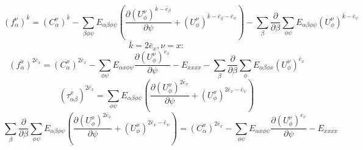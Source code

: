 \documentclass[a4paper,12pt]{article}
\begin{document}
\begin{landscape}
$$
\left(f^{\nu}_{\alpha}\right)^{\bar{k}}=
\left(C^{\nu}_{\alpha}\right)^{\bar{k}}-
\sum\limits_{\beta\phi\psi} E_{\alpha\beta\phi\psi} 
\left(\frac{\partial\left(U^{\nu}_{\phi}\right)^{\bar{k}-\bar{e}_{\beta}}}{\partial \psi} + \left(U^{\nu}_{\phi}\right)^{\bar{k}-\bar{e}_{\beta}-\bar{e}_{\psi}}\right)
-\sum\limits_{\beta}\frac{\partial}{\partial\beta}\sum\limits_{\phi\psi}
E_{\alpha\beta\phi\psi}\left(U^{\nu}_{\phi}\right)^{\bar{k}-\bar{e}_{\psi}}
$$
$$
\bar{k}=2\bar{e}_x, \nu = x:
$$
$$
\left(f^{x}_{\alpha}\right)^{2\bar{e}_x}=
\left(C^{x}_{\alpha}\right)^{2\bar{e}_x}-
\sum\limits_{\phi\psi} E_{\alpha x \phi\psi}
\frac{\partial\left(U^{\nu}_{\phi}\right)^{e_x}}{\partial \psi}-
E_{x x x x}
-\sum\limits_{\beta}\frac{\partial}{\partial\beta}\sum\limits_{\phi}
E_{\alpha\beta\phi x}\left(U^{\nu}_{\phi}\right)^{\bar{e}_x}
$$
$$
\left(\tau^{x}_{\alpha\beta}\right)^{2\bar{e}_x}=
\sum\limits_{\phi\psi} E_{\alpha\beta\phi\psi}
\left(\frac{\partial\left(U^{x}_{\phi}\right)^{2\bar{e}_x}}{\partial \psi} + \left(U^{x}_{\phi}\right)^{2\bar{e}_x-\bar{e}_{\psi}}\right)
$$
$$
\sum\limits_{\beta}\frac{\partial}{\partial\beta}\sum\limits_{\phi\psi}
E_{\alpha\beta\phi\psi}
\left(\frac{\partial\left(U^{x}_{\phi}\right)^{2\bar{e}_x}}{\partial \psi} + \left(U^{x}_{\phi}\right)^{2\bar{e}_x-\bar{e}_{\psi}}\right)
=
\left(C^{x}_{\alpha}\right)^{2\bar{e}_x}-
\sum\limits_{\phi\psi} E_{\alpha x \phi\psi}
\frac{\partial\left(U^{\nu}_{\phi}\right)^{e_x}}{\partial \psi}
-E_{x x x x}
$$
\end{landscape}
\end{document}
